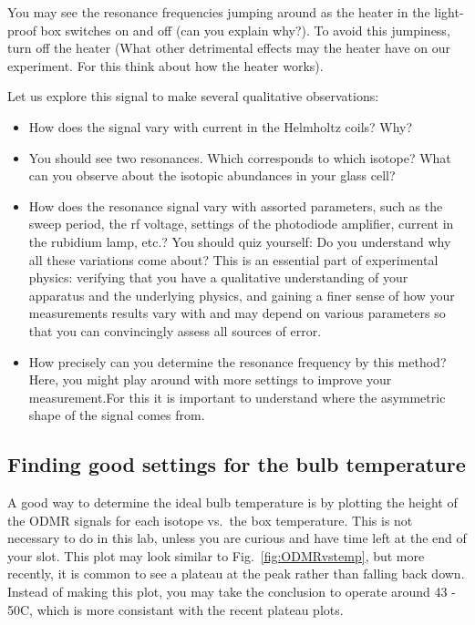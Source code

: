 \documentclass{../lab}
\begin{document}
You may see the resonance frequencies jumping around as the heater in the light-proof box switches on and off (can you explain why?).  To avoid this jumpiness, turn off the heater (What other detrimental effects may the heater have on our experiment. For this think about how the heater works).

Let us explore this signal to make several qualitative observations:
\begin{itemize}
    \item How does the signal vary with current in the Helmholtz coils?  Why?
    \item You should see two resonances.  Which corresponds to which isotope?  What can you observe about the isotopic abundances in your glass cell?
    \item How does the resonance signal vary with assorted parameters, such as the sweep period, the rf voltage, settings of the photodiode amplifier, current in the rubidium lamp, etc.?  You should quiz yourself: Do you understand why all these variations come about?  This is an essential part of experimental physics: verifying that you have a qualitative understanding of your apparatus and the underlying physics, and gaining a finer sense of how your measurements results vary with and may depend on various parameters so that you can convincingly assess all sources of error.
    \item How precisely can you determine the resonance frequency by this method?  Here, you might play around with more settings to improve your measurement.For this it is important to understand where the asymmetric shape of the signal comes from. 
\end{itemize}

\subsection{Finding good settings for the bulb temperature}
\label{sec:optimal-temp}

A good way to determine the ideal bulb temperature is by plotting the height of the ODMR signals for each isotope vs.\ the box temperature. This is not necessary to do in this lab, unless you are curious and have time left at the end of your slot. This plot may look similar to Fig.\ \ref{fig:ODMRvstemp}, but more recently, it is common to see a plateau at the peak rather than falling back down. Instead of making this plot, you may take the conclusion to operate around 43 - 50\textdegree C, which is more consistant with the recent plateau plots.
\end{document}
